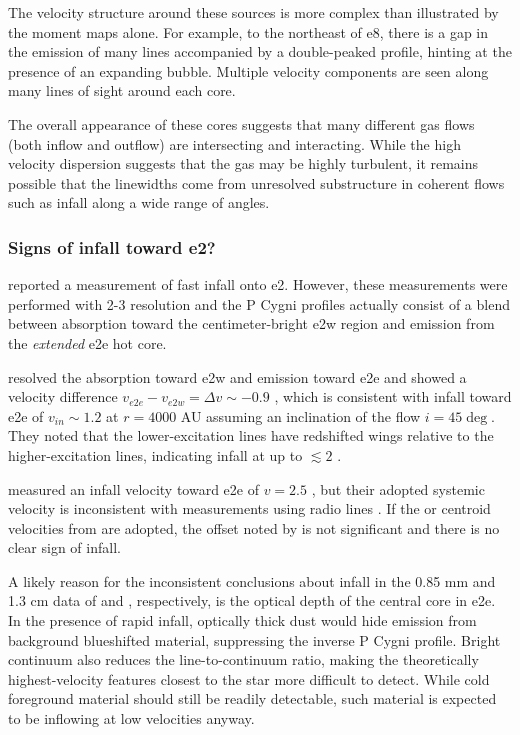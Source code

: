 \documentclass{emulateapj}
\begin{document}
The velocity structure around these sources is more complex than illustrated by
the moment maps alone.  For example, to the northeast of e8, there is a gap in
the emission of many lines accompanied by a double-peaked profile, hinting at
the presence of an expanding bubble.  Multiple velocity components are seen
along many lines of sight around each core.

The overall appearance of these cores suggests that many different gas flows
(both inflow and outflow) are intersecting and interacting.  While the high
velocity dispersion suggests that the gas may be highly turbulent, it remains
possible that the linewidths come from unresolved substructure in coherent
flows such as infall along a wide range of angles.

\subsubsection{Signs of infall toward e2?}
\citet{Zhang1997a}  reported a measurement of fast infall onto e2.
However, these measurements were performed with 2-3 \arcsec resolution and the
P Cygni profiles actually consist of a blend between absorption toward the
centimeter-bright e2w \hii region and emission from the \emph{extended} e2e hot
core.  

\citet{Goddi2016a} resolved the absorption toward e2w and emission
toward e2e and showed a velocity difference $v_{e2e}-v_{e2w} = \Delta v \sim
-0.9$ \kms, which is consistent with infall toward e2e of $v_{in}\sim1.2$ \kms
at $r=4000$ AU assuming an inclination of the flow $i=45\deg$.  They noted
that the lower-excitation \ammonia lines have redshifted wings relative to
the higher-excitation lines, indicating infall at up to $\lesssim 2$ \kms.

\citet{Shi2010a} measured an infall velocity toward e2e of $v=2.5$ \kms, 
but their adopted systemic velocity is inconsistent with measurements
using radio lines \citep{Goddi2016a}.  If the \methanol or \ammonia centroid
velocities from \citet{Goddi2016a} are adopted, the offset noted by
\citet{Shi2010a} is not significant and there is no clear sign of infall.

A likely reason for the inconsistent conclusions about infall in the 0.85 mm
and 1.3 cm data of \citet{Shi2010a} and \citet{Goddi2016a}, respectively, is
the optical depth of the central core in e2e.  In the presence of rapid infall,
optically thick dust would hide emission from background blueshifted material,
suppressing the inverse P Cygni profile.  Bright continuum also reduces the
line-to-continuum ratio, making the theoretically highest-velocity features
closest to the star more difficult to detect.  While cold foreground material
should still be readily detectable, such material is expected to be inflowing
at low velocities anyway.
\end{document}
